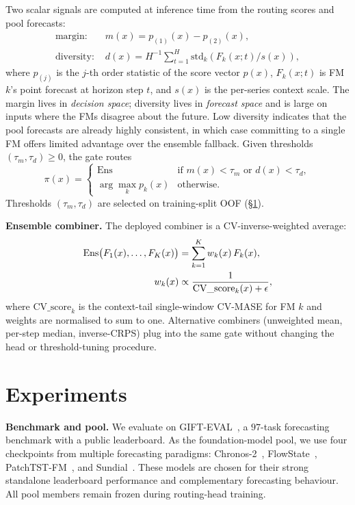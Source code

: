 \documentclass{article}
\theoremstyle{plain}
\theoremstyle{definition}
\theoremstyle{remark}
\begin{document}
Two scalar signals are computed at inference time from the routing scores and pool forecasts:
\begin{align}
\text{margin: } & m(x) = p_{(1)}(x) - p_{(2)}(x), \\
\text{diversity: } & d(x) = H^{-1} \sum_{t=1}^{H} \mathrm{std}_{k}\!\left( F_k(x; t) / s(x) \right),
\end{align}
where $p_{(j)}$ is the $j$-th order statistic of the score vector $p(x)$, $F_k(x; t)$ is FM $k$'s point forecast at horizon step $t$, and $s(x)$ is the per-series context scale. The margin lives in \emph{decision space}; diversity lives in \emph{forecast space} and is large on inputs where the FMs disagree about the future. Low diversity indicates that the pool forecasts are already highly consistent, in which case committing to a single FM offers limited advantage over the ensemble fallback. Given thresholds $(\tau_m, \tau_d) \ge 0$, the gate routes
\begin{equation}
\label{eq:gate}
\pi(x) = \begin{cases}
\mathrm{Ens} & \text{if } m(x) < \tau_m \text{ or } d(x) < \tau_d, \\
\arg\max_{k} p_k(x) & \text{otherwise}.
\end{cases}
\end{equation}
Thresholds $(\tau_m, \tau_d)$ are selected on training-split OOF (\S\ref{sec:experiments}).

\textbf{Ensemble combiner.} The deployed combiner is a CV-inverse-weighted average:
\begin{align}
\mathrm{Ens}\bigl(F_1(x), \dots, F_K(x)\bigr) &= \sum_{k=1}^{K} w_k(x)\, F_k(x), \label{eq:ens} \\
w_k(x) &\propto \frac{1}{\mathrm{CV\_score}_k(x) + \epsilon}, \notag
\end{align}
where $\mathrm{CV\_score}_k$ is the context-tail single-window CV-MASE for FM $k$ and weights are normalised to sum to one. Alternative combiners (unweighted mean, per-step median, inverse-CRPS) plug into the same gate without changing the head or threshold-tuning procedure.

\section{Experiments}
\label{sec:experiments}

\textbf{Benchmark and pool.} We evaluate on GIFT-EVAL~\citep{gifteval2024}, a $97$-task forecasting benchmark with a public leaderboard. As the foundation-model pool, we use four checkpoints from multiple forecasting paradigms: Chronos-2~\citep{ansari2025chronos2}, FlowState~\citep{graf2025flowstate}, PatchTST-FM~\citep{wen2026patchtstfm}, and Sundial~\citep{liu2025sundial}. These models are chosen for their strong standalone leaderboard performance and complementary forecasting behaviour. All pool members remain frozen during routing-head training.
\end{document}

